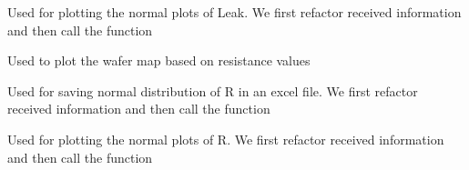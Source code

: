 \documentclass[letterpaper,10pt,english]{sphinxmanual}
\begin{document}

\begin{fulllineitems}
\label{\detokenize{app:app.Leak_normal}}
\pysigstartsignatures
{}
\pysigstopsignatures
\sphinxAtStartPar
Used for plotting the normal plots of Leak.
We first refactor received information and then call the function

\end{fulllineitems}


\begin{fulllineitems}
\label{\detokenize{app:app.R_WM}}
\pysigstartsignatures
{}
\pysigstopsignatures
\sphinxAtStartPar
Used to plot the wafer map based on resistance values

\end{fulllineitems}


\begin{fulllineitems}
\label{\detokenize{app:app.R_excel_normal}}
\pysigstartsignatures
{}
\pysigstopsignatures
\sphinxAtStartPar
Used for saving normal distribution of R in an excel file.
We first refactor received information and then call the function

\end{fulllineitems}


\begin{fulllineitems}
\label{\detokenize{app:app.R_normal}}
\pysigstartsignatures
{}
\pysigstopsignatures
\sphinxAtStartPar
Used for plotting the normal plots of R.
We first refactor received information and then call the function

\end{fulllineitems}
\end{document}
